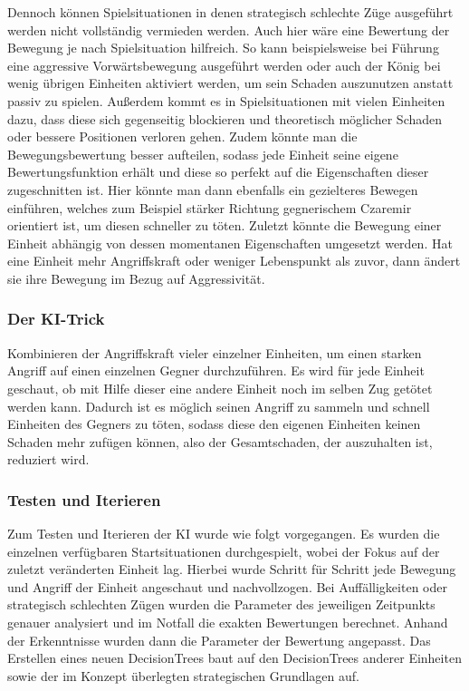 Dennoch können Spielsituationen in denen strategisch schlechte Züge ausgeführt werden nicht vollständig vermieden werden. Auch hier wäre eine Bewertung der Bewegung je nach Spielsituation hilfreich. So kann beispielsweise bei Führung eine aggressive Vorwärtsbewegung ausgeführt werden oder auch der König bei wenig übrigen Einheiten aktiviert werden, um sein Schaden auszunutzen anstatt passiv zu spielen. Außerdem kommt es in Spielsituationen mit vielen Einheiten dazu, dass diese sich gegenseitig blockieren und theoretisch möglicher Schaden oder bessere Positionen verloren gehen. Zudem könnte man die Bewegungsbewertung besser aufteilen, sodass jede Einheit seine eigene Bewertungsfunktion erhält und diese so perfekt auf die Eigenschaften dieser zugeschnitten ist. Hier könnte man dann ebenfalls ein gezielteres Bewegen einführen, welches zum Beispiel stärker Richtung gegnerischem Czaremir orientiert ist, um diesen schneller zu töten. Zuletzt könnte die Bewegung einer Einheit abhängig von dessen momentanen Eigenschaften umgesetzt werden. Hat eine Einheit mehr Angriffskraft oder weniger Lebenspunkt als zuvor, dann ändert sie ihre Bewegung im Bezug auf Aggressivität. 


\subsubsection{Der KI-Trick}

Kombinieren der Angriffskraft vieler einzelner Einheiten, um einen starken Angriff auf einen einzelnen Gegner durchzuführen. Es wird für jede Einheit geschaut, ob mit Hilfe dieser eine andere Einheit noch im selben Zug getötet werden kann. Dadurch ist es möglich seinen Angriff zu sammeln und schnell Einheiten des Gegners zu töten, sodass diese den eigenen Einheiten keinen Schaden mehr zufügen können, also der Gesamtschaden, der auszuhalten ist, reduziert wird.

\subsubsection{Testen und Iterieren}

Zum Testen und Iterieren der KI wurde wie folgt vorgegangen. Es wurden die einzelnen verfügbaren Startsituationen durchgespielt, wobei der Fokus auf der zuletzt veränderten Einheit lag. Hierbei wurde Schritt für Schritt jede Bewegung und Angriff der Einheit angeschaut und nachvollzogen. Bei Auffälligkeiten oder strategisch schlechten Zügen wurden die Parameter des jeweiligen Zeitpunkts genauer analysiert und im Notfall die exakten Bewertungen berechnet. Anhand der Erkenntnisse wurden dann die Parameter der Bewertung angepasst. Das Erstellen eines neuen DecisionTrees baut auf den DecisionTrees anderer Einheiten sowie der im Konzept überlegten strategischen Grundlagen auf.

